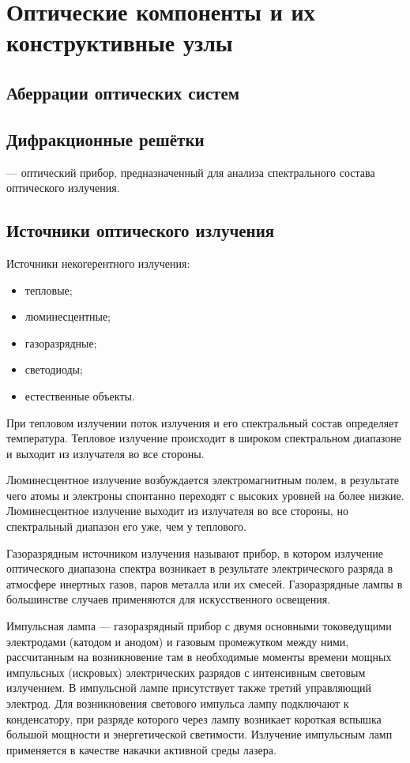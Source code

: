 \chapter{Оптические компоненты и их конструктивные узлы}

\section{Аберрации оптических систем}


\section{Дифракционные решётки}
  --- оптический прибор, предназначенный для анализа спектрального состава оптического излучения.


\section{Источники оптического излучения}
Источники некогерентного излучения:
\begin{itemize}
	\item тепловые;
	\item люминесцентные;
	\item газоразрядные;
	\item светодиоды;
	\item естественные объекты.
\end{itemize}

При тепловом излучении поток излучения и его спектральный состав определяет температура. 
Тепловое излучение происходит в широком спектральном диапазоне и выходит из излучателя во все стороны.

Люминесцентное излучение возбуждается электромагнитным полем, в результате чего атомы и электроны спонтанно переходят с высоких уровней на более низкие.
Люминесцентное излучение выходит из излучателя во все стороны, но спектральный диапазон его уже, чем у теплового.

Газоразрядным источником излучения называют прибор, в котором излучение оптического диапазона спектра возникает в результате электрического разряда в атмосфере инертных газов, паров металла или их смесей. Газоразрядные лампы в большинстве случаев применяются для искусственного освещения.

Импульсная лампа --- газоразрядный прибор с двумя основными токоведущими электродами (катодом и анодом) и газовым промежутком между ними, рассчитанным на возникновение там в необходимые моменты времени мощных импульсных (искровых) электрических разрядов с интенсивным световым излучением. 
В импульсной лампе присутствует также третий управляющий электрод. 
Для возникновения светового импульса лампу подключают к конденсатору, при разряде которого через лампу возникает короткая вспышка большой мощности и энергетической светимости.
Излучение импульсным ламп применяется в качестве накачки активной среды лазера.


